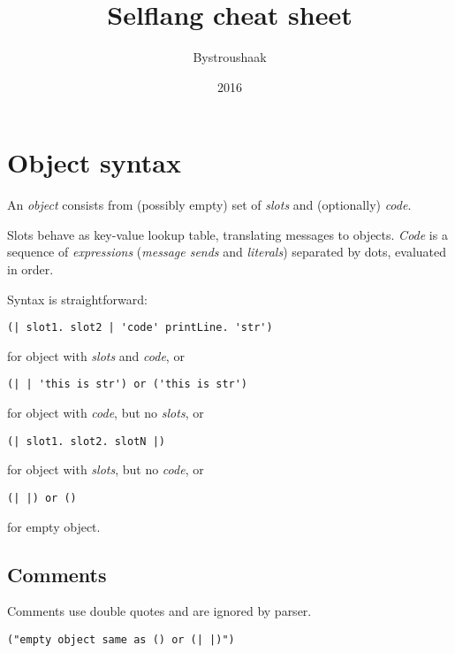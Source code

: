 \documentclass[10pt]{article}
\title{Selflang cheat sheet}
\author{Bystroushaak}
\date{2016}
\renewcommand{\maketitle}{
    {\begin{center}\Large \mythetitle\end{center}}
}
\begin{document}
\begin{multicols*}{3}
\maketitle




\section{Object syntax}
An \textit{object} consists from (possibly empty) set of \textit{slots} and (optionally) \textit{code}.

Slots behave as key-value lookup table, translating messages to objects. \textit{Code} is a sequence of \textit{expressions} (\textit{message sends} and \textit{literals}) separated by dots, evaluated in order.

Syntax is straightforward:

\begin{lstlisting}
(| slot1. slot2 | 'code' printLine. 'str')
\end{lstlisting}

for object with \textit{slots} and \textit{code}, or

\begin{lstlisting}
(| | 'this is str') or ('this is str')
\end{lstlisting}

for object with \textit{code}, but no \textit{slots}, or

\begin{lstlisting}
(| slot1. slot2. slotN |)
\end{lstlisting}

for object with \textit{slots}, but no \textit{code}, or

\begin{lstlisting}
(| |) or ()
\end{lstlisting}

for empty object.



\subsection{Comments}

Comments use double quotes and are ignored by parser.

\begin{lstlisting}
("empty object same as () or (| |)")
\end{lstlisting}




\end{multicols*}
\end{document}
